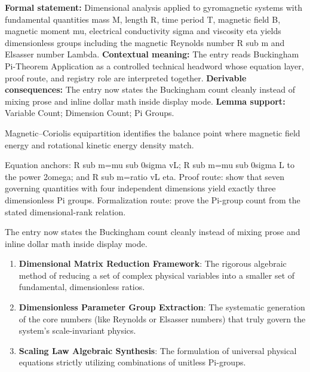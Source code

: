 \begingroup\footnotesize\setlength{\emergencystretch}{3em}\sloppy
\textbf{Formal statement:} Dimensional analysis applied to gyromagnetic systems with fundamental quantities mass M, length R, time period T, magnetic field B, magnetic moment mu, electrical conductivity sigma and viscosity eta yields dimensionless groups including the magnetic Reynolds number R sub m and Elsasser number Lambda. \textbf{Contextual meaning:} The entry reads Buckingham Pi-Theorem Application as a controlled technical headword whose equation layer, proof route, and registry role are interpreted together. \textbf{Derivable consequences:} The entry now states the Buckingham count cleanly instead of mixing prose and inline dollar math inside display mode. \textbf{Lemma support:} Variable Count; Dimension Count; Pi Groups.\par
\endgroup

Magnetic--Coriolis equipartition identifies the balance point where magnetic field energy and rotational kinetic energy density match.

Equation anchors: R sub m=mu sub 0sigma vL; R sub m=mu sub 0sigma L to the power 2omega; and R sub m=ratio vL eta. Proof route: show that seven governing quantities with four independent dimensions yield exactly three dimensionless Pi groups. Formalization route: prove the Pi-group count from the stated dimensional-rank relation.

The entry now states the Buckingham count cleanly instead of mixing prose and inline dollar math inside display mode.
\endgroup

\begin{enumerate}[leftmargin=1.6em,itemsep=6pt,topsep=4pt]
\item \textbf{Dimensional Matrix Reduction Framework}: The rigorous algebraic method of reducing a set of complex physical variables into a smaller set of fundamental, dimensionless ratios.
\item \textbf{Dimensionless Parameter Group Extraction}: The systematic generation of the core numbers (like Reynolds or Elsasser numbers) that truly govern the system's scale-invariant physics.
\item \textbf{Scaling Law Algebraic Synthesis}: The formulation of universal physical equations strictly utilizing combinations of unitless Pi-groups.
\end{enumerate}

